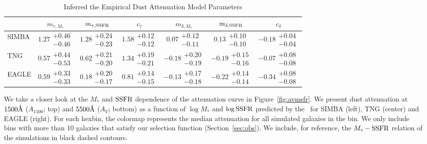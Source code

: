 \begin{table}
    \caption{Inferred the Empirical Dust Attenuation Model Parameters}
    \begin{tabular}{lcccccc} \toprule
        & $m_{\tau,M_*}$ & $m_{\tau,{\rm SSFR}}$ & $c_\tau$ & $m_{\delta,M_*}$ & $m_{\delta,{\rm SSFR}}$ & $c_\delta$ \\[3pt] \hline\hline
        SIMBA   & $1.27\substack{+0.46\\-0.46}$ &
        $1.28\substack{+0.24\\-0.23}$ & $1.58\substack{+0.12\\-0.12}$ &
        $0.07 \substack{+0.12\\-0.11}$ & $0.13 \substack{+0.10\\-0.10}$ &
        $-0.18\substack{+0.04\\-0.04}$ \\
        TNG     & $0.57\substack{+0.44\\-0.53}$ &
        $0.62\substack{+0.21\\-0.20}$ & $1.34\substack{+0.19\\-0.21}$ &
        $-0.18\substack{+0.20\\-0.19}$ & $-0.19\substack{+0.15\\-0.16}$ &
        $-0.07\substack{+0.08\\-0.08}$ \\
        EAGLE   & $0.59\substack{+0.33\\-0.33}$ &
        $0.18\substack{+0.20\\-0.17}$ & $0.81\substack{+0.14\\-0.15}$ &
        $-0.13\substack{+0.17\\-0.18}$ & $-0.22\substack{+0.14\\-0.14}$ &
        $-0.34\substack{+0.08\\-0.08}$\\
        \hline
    \end{tabular} \label{tab:posterior}
\end{table}

We take a closer look at the $M_*$ and ${\rm SSFR}$ dependence of the attenuation
curve in Figure~\ref{fig:avmsfr}. 
We present dust attenuation at $1500\AA$ ($A_{1500}$; top) and $5500\AA$
($A_V$; bottom) as a function of $\log M_*$ and $\log {\rm SSFR}$ predicted by the
\eda~for SIMBA (left), TNG (center) and EAGLE (right). 
For each hexbin, the colormap represents the median attenuation for all
simulated galaxies in the bin. 
We only include bins with more than 10 galaxies that satisfy our selection
function (Section~\ref{sec:obs}). 
We include, for reference, the $M_* - {\rm SSFR}$ relation of the simulations in
black dashed contours.

